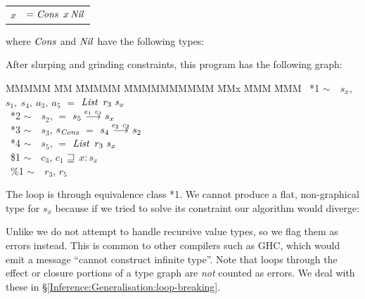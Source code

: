 \qq\qq
\begin{tabular}{ll}
	$x$	& $= \operatorname{\mathit{Cons}} \ x \operatorname{\mathit{Nil}}$
\end{tabular}

where $\operatorname{\mathit{Cons}}$ and $\operatorname{\mathit{Nil}}$ have the following types:




After slurping and grinding constraints, this program has the following graph:
\qq\qq
\begin{tabbing}
MMMMM 	\= MM 	\= MMMMM 	\= MMMMMMMMMM 		\= MMx \= MMM \= MMM \kill
	\> \ *1	\> $\sim \quad s_x,$	\> $s_1, \ s_4, \ a_3, \ a_5$	\> \quad $=$	\> $\operatorname{\mathit{List}} \ r_3 \ s_x$ \\
	\> \ *2	\> $\sim \quad s_2$,	\>				\> \quad $=$	\> $s_5 \stackrel{e_1 \ c_1}{\longrightarrow} s_x$ \\
	\> \ *3	\> $\sim \quad s_3$,	\> $s_{\operatorname{\mathit{Cons}}}$			\> \quad $=$	\> $s_4 \stackrel{e_2 \ c_2}{\longrightarrow} s_2$ \\
	\> \ *4 \> $\sim \quad s_5$,	\> 				\> \quad $=$	\> $\operatorname{\mathit{List}} \ r_3 \ s_x$ \\
	\> \ \$1 \> $\sim \quad c_3$,	\> $c_1$			\> \quad $\sqsupseteq$	\> $x : s_x$ \\
	\> \ \%1 \> $\sim \quad r_3$,	\> $r_5$ 
\end{tabbing}


The loop is through equivalence class *1. We cannot produce a flat, non-graphical type for $s_x$ because if we tried to solve its constraint our algorithm would diverge:


\bigskip
Unlike \cite{cardone:recursive-types} we do not attempt to handle recursive value types, so we flag them as errors instead. This is common to other compilers such as GHC, which would emit a message ``cannot construct infinite type''. Note that loops through the effect or closure portions of a type graph are \emph{not} counted as errors. We deal with these in \S\ref{Inference:Generalisation:loop-breaking}.


